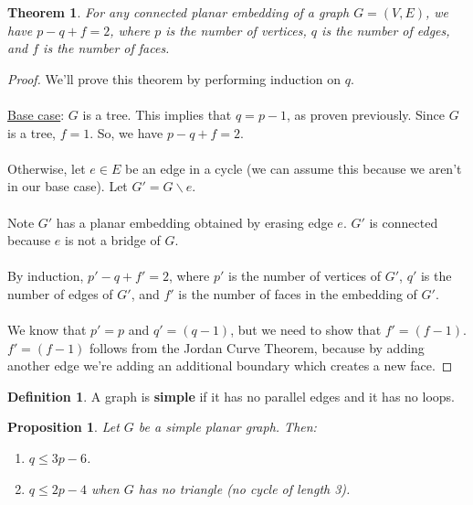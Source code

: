 \documentclass[]{article}
\newtheorem*{theorem}{Theorem}
\newtheorem*{proposition}{Proposition}
\theoremstyle{definition}
\newtheorem*{defn}{Definition}
\newcommand{\lecture}[1]{\marginpar{{\footnotesize $\leftarrow$ \underline{#1}}}}
\begin{document}
			\begin{theorem}
				For any connected planar embedding of a graph $G = (V, E)$, we have $p - q + f = 2$, where $p$ is the number of vertices, $q$ is the number of edges, and $f$ is the number of faces.
			\end{theorem}

			\begin{proof}
				We'll prove this theorem by performing induction on $q$.
				\\ \\
				\underline{Base case}: $G$ is a tree. This implies that $q = p - 1$, as proven previously. Since $G$ is a tree, $f = 1$. So, we have $p - q + f = 2$.
				\\ \\
				Otherwise, let $e \in E$ be an edge in a cycle (we can assume this because we aren't in our base case). Let $G' = G \backslash e$.
				\\ \\
				Note $G'$ has a planar embedding obtained by erasing edge $e$. $G'$ is connected because $e$ is not a bridge of $G$.
				\\ \\
				By induction, $p' - q + f' = 2$, where $p'$ is the number of vertices of $G'$, $q'$ is the number of edges of $G'$, and $f'$ is the number of faces in the embedding of $G'$.
				\\ \\
				We know that $p' = p$ and $q' = (q - 1)$, but we need to show that $f' = (f - 1)$. $f' = (f - 1)$ follows from the Jordan Curve Theorem, because by adding another edge we're adding an additional boundary which creates a new face.
			\end{proof}
			
			\begin{defn} \lecture{March 15, 2013}
				A graph is \textbf{simple} if it has no parallel edges and it has no loops.
			\end{defn}

			\begin{proposition}
				Let $G$ be a simple planar graph. Then:
				\begin{enumerate}
					\item $q \le 3p - 6$.
					\item $q \le 2p - 4$ when $G$ has no triangle (no cycle of length 3).
				\end{enumerate}
			\end{proposition}
\end{document}
